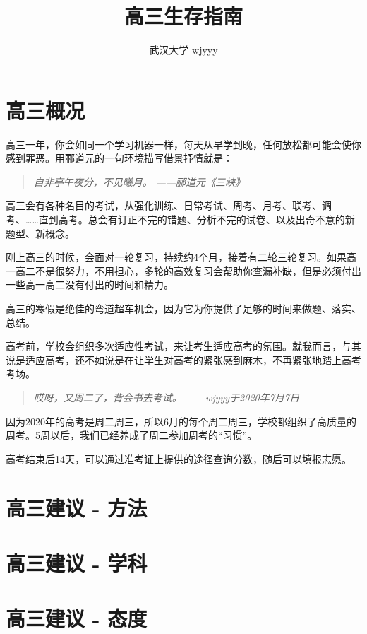 \documentclass[UTF8,11pt,a4paper]{ctexart}
\title{\textbf{高三生存指南}}
\author{武汉大学 wjyyy}
\begin{document}
	\maketitle
	\tableofcontents
	\section{高三概况}
		高三一年，你会如同一个学习机器一样，每天从早学到晚，任何放松都可能会使你感到罪恶。用郦道元的一句环境描写借景抒情就是：
		\begin{quote}
			\textit{自非亭午夜分，不见曦月。}
			\flushright\textit{——郦道元《三峡》}
		\end{quote}
		
		高三会有各种名目的考试，从强化训练、日常考试、周考、月考、联考、调考、……直到高考。总会有订正不完的错题、分析不完的试卷、以及出奇不意的新题型、新概念。
		
		刚上高三的时候，会面对一轮复习，持续约4个月，接着有二轮三轮复习。如果高一高二不是很努力，不用担心，多轮的高效复习会帮助你查漏补缺，但是必须付出一些高一高二没有付出的时间和精力。
		
		高三的寒假是绝佳的弯道超车机会，因为它为你提供了足够的时间来做题、落实、总结。
		
		高考前，学校会组织多次适应性考试，来让考生适应高考的氛围。就我而言，与其说是适应高考，还不如说是在让学生对高考的紧张感到麻木，不再紧张地踏上高考考场。
		
		\begin{quote}
			\textit{哎呀，又周二了，背会书去考试。}
			\flushright\textit{——wjyyy于2020年7月7日}
		\end{quote}
	
		因为2020年的高考是周二周三，所以6月的每个周二周三，学校都组织了高质量的周考。5周以后，我们已经养成了周二参加周考的“习惯”。
		
		高考结束后14天，可以通过准考证上提供的途径查询分数，随后可以填报志愿。
	\section{高三建议 - 方法}
	
	\section{高三建议 - 学科}
	
	\section{高三建议 - 态度}%
\end{document}
